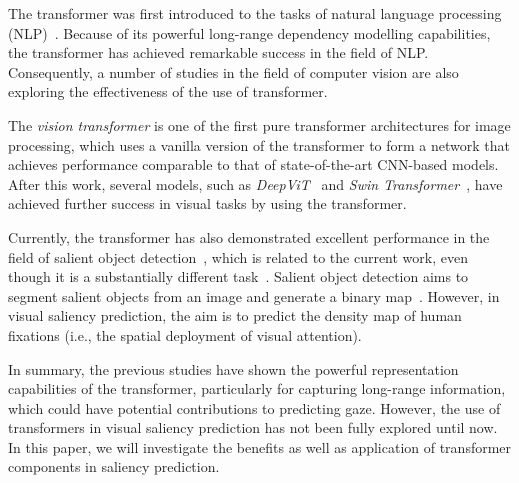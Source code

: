\documentclass{article}
\begin{document}
The transformer was first introduced to the tasks of natural language processing (NLP)~\cite{att_is_all}. Because of its powerful long-range dependency modelling capabilities,  the transformer has achieved remarkable success in the field of NLP. Consequently, a number of studies in the field of computer vision are also exploring the effectiveness of the use of transformer. 

The \textit{vision transformer} is one of the first pure transformer architectures for image processing, which uses a vanilla version of the transformer to form a network that achieves performance comparable to that of state-of-the-art CNN-based models. After this work, several models, such as \textit{DeepViT}~\cite{DeepViT} and \textit{Swin Transformer}~\cite{Swin_Transformer}, have achieved further success in visual tasks by using the transformer.

Currently, the transformer has also demonstrated excellent performance in the field of salient object detection~\cite{Visual_Saliency_Transformer}, which is related to the current work, even though it is a substantially different task~\cite{TPAMI_PRVS}. Salient object detection aims to segment salient objects from an image and generate a binary map~\cite{TIP_SOD}. However, in visual saliency prediction, the aim is to predict the density map of human fixations (i.e., the spatial deployment of visual attention).

In summary, the previous studies have shown the powerful representation capabilities of the transformer, particularly for capturing long-range information, which could have potential contributions to predicting gaze. However, the use of transformers in visual saliency prediction has not been fully explored until now. In this paper, we will investigate the benefits as well as application of transformer components in saliency prediction.
\end{document}
